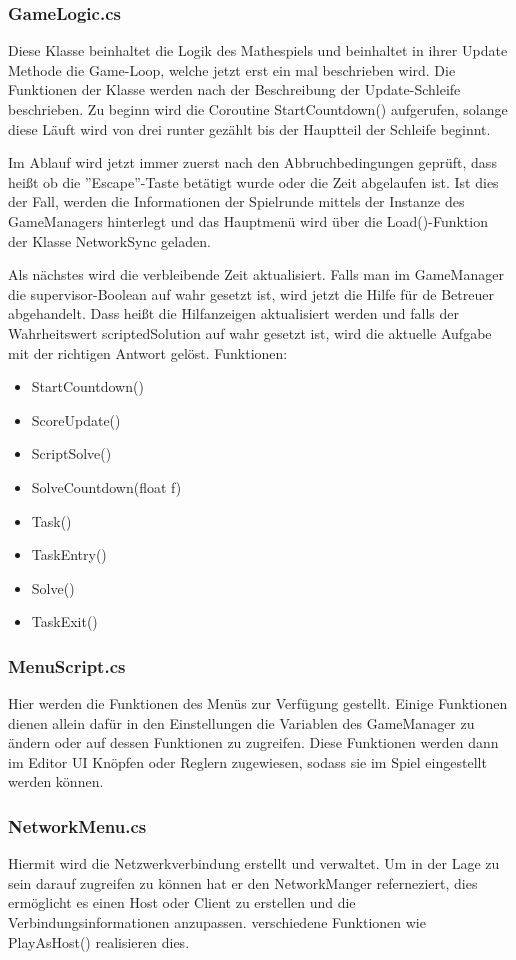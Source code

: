\subsubsection{GameLogic.cs}
Diese Klasse beinhaltet die Logik des Mathespiels und beinhaltet in ihrer Update Methode die Game-Loop, welche jetzt erst ein mal beschrieben wird. Die Funktionen der Klasse werden nach der Beschreibung der Update-Schleife beschrieben. Zu beginn wird die Coroutine StartCountdown() aufgerufen, solange diese Läuft wird von drei runter gezählt bis der Hauptteil der Schleife beginnt. \par
Im Ablauf wird jetzt immer zuerst nach den Abbruchbedingungen geprüft, dass heißt ob die ''Escape''-Taste betätigt wurde oder die Zeit abgelaufen ist. Ist dies der Fall, werden die Informationen der Spielrunde mittels der Instanze des GameManagers hinterlegt und das Hauptmenü wird über die Load()-Funktion der Klasse NetworkSync geladen.\par
Als nächstes wird die verbleibende Zeit aktualisiert.
Falls man im GameManager die supervisor-Boolean auf wahr gesetzt ist, wird jetzt die Hilfe für de Betreuer abgehandelt. Dass heißt die Hilfanzeigen aktualisiert werden und falls der Wahrheitswert scriptedSolution auf wahr gesetzt ist, wird die aktuelle Aufgabe mit der richtigen Antwort gelöst.
Funktionen:\begin{itemize}
\item StartCountdown()
\item ScoreUpdate()
\item ScriptSolve()
\item SolveCountdown(float f)
\item Task()
\item TaskEntry()
\item Solve()
\item TaskExit()
\end{itemize}
\subsubsection{MenuScript.cs}
Hier werden die Funktionen des Menüs zur Verfügung gestellt. Einige Funktionen dienen allein dafür in den Einstellungen die Variablen des GameManager zu ändern oder auf dessen Funktionen zu zugreifen. Diese Funktionen werden dann im Editor UI Knöpfen oder  Reglern zugewiesen, sodass sie im Spiel eingestellt werden können.
\subsubsection{NetworkMenu.cs}
Hiermit wird die Netzwerkverbindung erstellt und verwaltet. Um in der Lage zu sein darauf zugreifen zu können hat er den NetworkManger referneziert, dies ermöglicht es einen Host oder Client zu erstellen und die Verbindungsinformationen anzupassen. verschiedene Funktionen wie PlayAsHost() realisieren dies.
